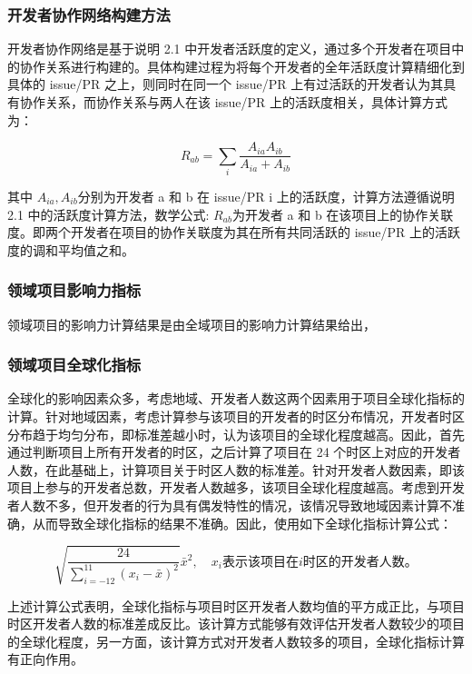 \subsubsection{​开发者协作网络构建方法}
开发者协作网络是基于说明 2.1 中开发者活跃度的定义，通过多个开发者在项目中的协作关系进行构建的。具体构建过程为将每个开发者的全年活跃度计算精细化到具体的 issue/PR 之上，则同时在同一个 issue/PR 上有过活跃的开发者认为其具有协作关系，而协作关系与两人在该 issue/PR 上的活跃度相关，具体计算方式为：

$$ R_{ab}=\sum_{i}{\frac{A_{ia}A_{ib}}{A_{ia}+A_{ib}}} $$

其中 $ A_{ia}, A_{ib} $分别为开发者 a 和 b 在 issue/PR i 上的活跃度，计算方法遵循说明 2.1 中的活跃度计算方法，数学公式: $ R_{ab} $为开发者 a 和 b 在该项目上的协作关联度。即两个开发者在项目的协作关联度为其在所有共同活跃的 issue/PR 上的活跃度的调和平均值之和。

\subsubsection{领域项目影响力指标}
\par 领域项目的影响力计算结果是由全域项目的影响力计算结果给出，%

\subsubsection{领域项目全球化指标}
\par 全球化的影响因素众多，考虑地域、开发者人数这两个因素用于项目全球化指标的计算。针对地域因素，考虑计算参与该项目的开发者的时区分布情况，开发者时区分布趋于均匀分布，即标准差越小时，认为该项目的全球化程度越高。因此，首先通过判断项目上所有开发者的时区，之后计算了项目在 24 个时区上对应的开发者人数，在此基础上，计算项目关于时区人数的标准差。针对开发者人数因素，即该项目上参与的开发者总数，开发者人数越多，该项目全球化程度越高。考虑到开发者人数不多，但开发者的行为具有偶发特性的情况，该情况导致地域因素计算不准确，从而导致全球化指标的结果不准确。因此，使用如下全球化指标计算公式：

$$ \sqrt{\frac{24}{\sum_{i=-12}^{11}{(x_i-\bar{x})^2}}}\bar{x}^2, \quad x_i表示该项目在i时区的开发者人数。 $$

\par 上述计算公式表明，全球化指标与项目时区开发者人数均值的平方成正比，与项目时区开发者人数的标准差成反比。该计算方式能够有效评估开发者人数较少的项目的全球化程度，另一方面，该计算方式对开发者人数较多的项目，全球化指标计算有正向作用。

